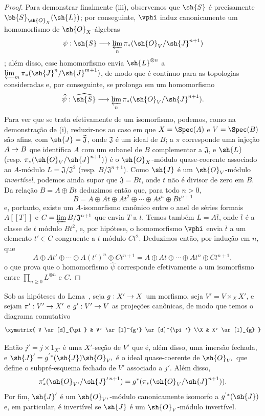 \documentclass[oneside,10pt]{amsart}
\makeatletter
\renewcommand{\geq}{\geqslant}
\newcommand{\ega@arrow}[2]{\mathchoice{#1}{#2}{#2}{#2}}
\renewcommand{\to}{\ega@arrow{\longrightarrow}{\rightarrow}}
\newcommand{\oldpage}[2][]{\marginnote{\normalfont\footnotesize\textbf{#1}~|~#2}\ignorespaces}
\let\EGAOriginalLabel\label
\renewcommand{\label}[1]{\phantomsection\EGAOriginalLabel{#1}}
\makeatother
\begin{document}
\begin{proof}
Para demonstrar finalmente (iii), observemos que $\sh{S}$ é precisamente $\bb{S}_{\sh{O}_X}(\sh{L})$;
por conseguinte, $\vphi$ induz canonicamente um homomorfismo de $\sh{O}_X$-álgebras
\[
  \psi:\sh{S}\longrightarrow
  \varprojlim_n\pi_*(\sh{O}_V/\sh{J}^{n+1})
\]
;
além disso, esse homomorfismo envia $\sh{L}^{\otimes n}$ a $\varprojlim_m\pi_*(\sh{J}^n/\sh{J}^{m+1})$, de modo que é contínuo para as topologias consideradas e, por conseguinte, se prolonga em um homomorfismo
\[
  \widehat{\psi}:\widehat{\sh{S}}\longrightarrow
  \varprojlim_n\pi_*(\sh{O}_V/\sh{J}^{n+1}).
\]
Para ver que se trata efetivamente de um isomorfismo, podemos, como na demonstração de (i), reduzir-nos ao caso em que $X=\Spec(A)$ e $V=\Spec(B)$ são afins, com $\sh{J}=\widetilde{\mathfrak{J}}$, onde $\mathfrak{J}$ é um ideal de $B$;
a $\pi$ corresponde uma injeção $A\to B$ que identifica $A$ com um subanel de $B$ complementar a $\mathfrak{J}$, e $\sh{L}$ (resp. $\pi_*(\sh{O}_V/\sh{J}^{n+1})$) é o $\sh{O}_X$-módulo quase-coerente associado ao $A$-módulo $L=\mathfrak{J}/\mathfrak{J}^2$ (resp. $B/\mathfrak{J}^{n+1}$).
Como $\sh{J}$ é um $\sh{O}_V$-módulo \emph{invertível}, podemos ainda supor que $\mathfrak{J}=Bt$, onde $t$ não é divisor de zero em $B$.
Da relação $B=A\oplus Bt$ deduzimos então que, para todo $n>0$,
\[
  B=A\oplus At\oplus At^2\oplus\cdots\oplus At^n\oplus Bt^{n+1}
\]
e, portanto, existe um $A$-isomorfismo canônico entre o anel de séries formais $A[[T]]$ e $C=\varprojlim B/\mathfrak{J}^{n+1}$ que envia $T$ a $t$.
Temos também $L=A\overline{t}$, onde $\overline{t}$ é a classe de $t$ módulo $Bt^2$, e, por hipótese, o homomorfismo $\vphi$ envia $\overline{t}$ a um elemento $t'\in C$ congruente a $t$ módulo $Ct^2$.
Deduzimos então, por indução em $n$, que
\[
  A\oplus At'\oplus\cdots\oplus A(t')^n\oplus Ct^{n+1}
  =A\oplus At\oplus\cdots\oplus At^n\oplus Ct^{n+1},
\]
o que prova que o homomorfismo $\widehat{\psi}$ corresponde efetivamente a um isomorfismo entre $\prod_{n\geq0}L^{\otimes n}$ e $C$.
\end{proof}

\begin{lemma}[8.10.2]
\label{II.8.10.2}
Sob as hipóteses do Lema~, seja $g:X'\to X$ um morfismo,
\oldpage[II]{186}
seja $V'=V\times_X X'$, e sejam $\pi':V'\to X'$ e $g':V'\to V$ as projeções canônicas, de modo que temos o diagrama comutativo
\[
  \xymatrix{
    V
      \ar[d]_{\pi}
  & V'
      \ar[l]^{g'}
      \ar[d]^{\pi'}
  \\X
  & X'
      \ar[l]_{g}
  }
\]

Então $j'=j\times1_{X'}$ é uma $X'$-seção de $V'$ que é, além disso, uma imersão fechada, e $\sh{J}'=g^{'*}(\sh{J})\sh{O}_{V'}$ é o ideal quase-coerente de $\sh{O}_{V'}$ que define o subpré-esquema fechado de $V'$ associado a $j'$.
Além disso,
\[
  \pi'_*(\sh{O}_{V'}/\sh{J}'^{\,n+1})
  =g^*(\pi_*(\sh{O}_V/\sh{J}^{n+1})).
\]
Por fim, $\sh{J}'$ é um $\sh{O}_{V'}$-módulo canonicamente isomorfo a $g^{'*}(\sh{J})$ e, em particular, é invertível se $\sh{J}$ é um $\sh{O}_V$-módulo invertível.
\end{lemma}
\end{document}

